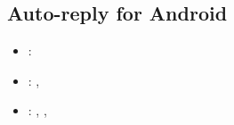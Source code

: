 \subsection{Auto-reply for Android}
\label{sec:auto_reply_android}
\begin{itemize} 
	\item {}: 
	\item {}: , 
	\item {}: , , 
\end{itemize} 


